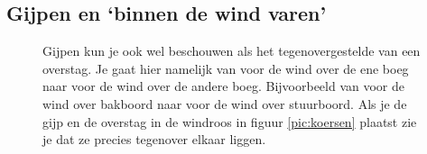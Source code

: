 \subsection{Gijpen en `binnen de wind varen'}
\begin{figure}[H]
	\centering
	\begin{minipage}[t]{0.78\textwidth}
		\vspace{-5cm}
		Gijpen kun je ook wel beschouwen als het tegenovergestelde van een overstag. Je gaat hier namelijk van voor de wind over de ene boeg naar voor de wind over de andere boeg. Bijvoorbeeld van voor de wind over bakboord naar voor de wind over stuurboord. Als je de gijp en de overstag in de windroos in figuur \ref{pic:koersen} plaatst zie je dat ze precies tegenover elkaar liggen.\\
		

\end{minipage}
\end{figure}
